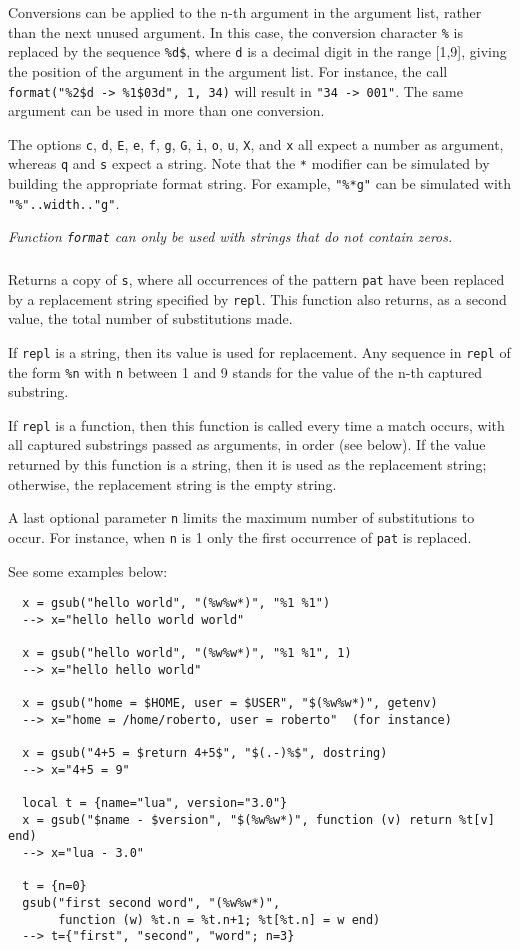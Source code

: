 Conversions can be applied to the n-th argument in the argument list,
rather than the next unused argument.
In this case, the conversion character \verb|%| is replaced
by the sequence \verb|%d$|, where \verb|d| is a
decimal digit in the range [1,9],
giving the position of the argument in the argument list.
For instance, the call \verb|format("%2$d -> %1$03d", 1, 34)| will
result in \verb|"34 -> 001"|.
The same argument can be used in more than one conversion.

The options \verb|c|, \verb|d|, \verb|E|, \verb|e|, \verb|f|,
\verb|g|, \verb|G|, \verb|i|, \verb|o|, \verb|u|, \verb|X|, and \verb|x| all
expect a number as argument,
whereas \verb|q| and \verb|s| expect a string.
Note that the \verb|*| modifier can be simulated by building
the appropriate format string.
For example, \verb|"%*g"| can be simulated with
\verb|"%"..width.."g"|.

\emph{Function \verb|format| can only be used with strings that do not
contain zeros.}

\subsubsection*{\ff {}}
Returns a copy of \verb|s|,
where all occurrences of the pattern \verb|pat| have been
replaced by a replacement string specified by \verb|repl|.
This function also returns, as a second value,
the total number of substitutions made.

If \verb|repl| is a string, then its value is used for replacement.
Any sequence in \verb|repl| of the form \verb|%n|
with \verb|n| between 1 and 9
stands for the value of the n-th captured substring.

If \verb|repl| is a function, then this function is called every time a
match occurs, with all captured substrings passed as arguments,
in order (see below).
If the value returned by this function is a string,
then it is used as the replacement string;
otherwise, the replacement string is the empty string.

A last optional parameter \verb|n| limits
the maximum number of substitutions to occur.
For instance, when \verb|n| is 1 only the first occurrence of
\verb|pat| is replaced.

See some examples below:
\begin{verbatim}
  x = gsub("hello world", "(%w%w*)", "%1 %1")
  --> x="hello hello world world"

  x = gsub("hello world", "(%w%w*)", "%1 %1", 1)
  --> x="hello hello world"

  x = gsub("home = $HOME, user = $USER", "$(%w%w*)", getenv)
  --> x="home = /home/roberto, user = roberto"  (for instance)

  x = gsub("4+5 = $return 4+5$", "$(.-)%$", dostring)
  --> x="4+5 = 9"

  local t = {name="lua", version="3.0"}
  x = gsub("$name - $version", "$(%w%w*)", function (v) return %t[v] end)
  --> x="lua - 3.0"

  t = {n=0}
  gsub("first second word", "(%w%w*)",
       function (w) %t.n = %t.n+1; %t[%t.n] = w end)
  --> t={"first", "second", "word"; n=3}
\end{verbatim}


